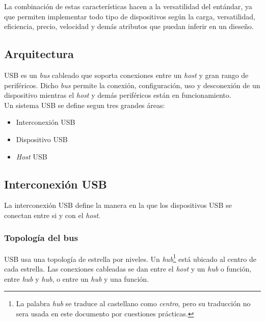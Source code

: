 La combinaci\'on de estas caracter\'isticas hacen a la versatilidad del
ent\'andar, ya que permiten implementar todo tipo de dispositivos seg\'un la
carga, versatilidad, eficiencia, precio, velocidad y dem\'as atributos que
puedan inferir en un diese\~no.

\subsection{Arquitectura}

USB es un \emph{bus} cableado que soporta conexiones entre un \emph{host} y
gran rango de perif\'ericos. Dicho \emph{bus} permite la conexi\'on,
configuraci\'on, uso y desconexi\'on de un dispositivo mientras el \emph{host}
y dem\'as perif\'ericos est\'an en funcionamiento. \\

Un sistema USB se  define segun tres grandes \'areas:

\begin{itemize}
 \item Interconexi\'on USB
 \item Dispositivo USB
 \item \emph{Host} USB
\end{itemize}

\subsection{Interconexi\'on USB}

La interconexi\'on USB define la manera en la que los dispositivos USB se
conectan entre si y con el \emph{host}. 

\subsubsection{Topolog\'ia del bus}

USB usa una topolog\'ia de estrella por niveles. Un \emph{hub}\footnote{La
palabra \emph{hub} se traduce al castellano como \emph{centro}, pero su
traducci\'on no sera usada en este documento por cuestiones pr\'acticas.}
est\'a ubicado al centro de cada estrella. Las conexiones cableadas se dan
entre el \emph{host} y un \emph{hub} o funci\'on, entre \emph{hub} y
\emph{hub}, o entre un \emph{hub} y una funci\'on. \\




